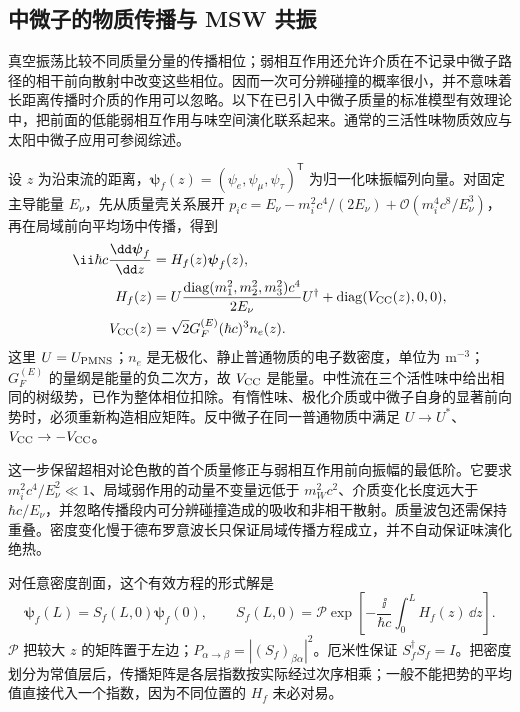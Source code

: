 \subsection{中微子的物质传播与 MSW 共振}
\label{sec:sm-neutrino-matter-applications}

真空振荡比较不同质量分量的传播相位；弱相互作用还允许介质在不记录中微子路径的相干前向散射中改变这些相位。因而一次可分辨碰撞的概率很小，并不意味着长距离传播时介质的作用可以忽略。以下在已引入中微子质量的标准模型有效理论中，把前面的低能弱相互作用与味空间演化联系起来。通常的三活性味物质效应与太阳中微子应用可参阅综述\cite{GonzalezGarciaYokoyama2024Neutrino}。

设 $z$ 为沿束流的距离，$\boldsymbol\psi_f(z)=(\psi_e,\psi_\mu,\psi_\tau)^{\mathsf T}$ 为归一化味振幅列向量。对固定主导能量 $E_\nu$，先从质量壳关系展开 $p_ic=E_\nu-m_i^2c^4/(2E_\nu)+\mathcal O(m_i^4c^8/E_\nu^3)$，再在局域前向平均场中传播，得到
\begin{equation}
 \begin{aligned}
 \ii\hbar c\frac{\dd\boldsymbol\psi_f}{\dd z}
 &=H_f(z)\boldsymbol\psi_f(z),\\
 H_f(z)&=U\frac{\operatorname{diag}(m_1^2,m_2^2,m_3^2)c^4}{2E_\nu}U^\dagger
       +\operatorname{diag}(V_{\rm CC}(z),0,0),\\
 V_{\rm CC}(z)&=\sqrt2G_F^{(E)}(\hbar c)^3 n_e(z).
 \end{aligned}
 \label{eq:sm-matter-flavor-hamiltonian}
\end{equation}
这里 $U=U_{\rm PMNS}$；$n_e$ 是无极化、静止普通物质的电子数密度，单位为 $\mathrm{m^{-3}}$；$G_F^{(E)}$ 的量纲是能量的负二次方，故 $V_{\rm CC}$ 是能量。中性流在三个活性味中给出相同的树级势，已作为整体相位扣除。有惰性味、极化介质或中微子自身的显著前向势时，必须重新构造相应矩阵。反中微子在同一普通物质中满足 $U\to U^*$、$V_{\rm CC}\to -V_{\rm CC}$。

这一步保留超相对论色散的首个质量修正与弱相互作用前向振幅的最低阶。它要求 $m_i^2c^4/E_\nu^2\ll1$、局域弱作用的动量不变量远低于 $m_W^2c^2$、介质变化长度远大于 $\hbar c/E_\nu$，并忽略传播段内可分辨碰撞造成的吸收和非相干散射。质量波包还需保持重叠。密度变化慢于德布罗意波长只保证局域传播方程成立，并不自动保证味演化绝热。

对任意密度剖面，这个有效方程的形式解是
\begin{equation}
 \boldsymbol\psi_f(L)=S_f(L,0)\boldsymbol\psi_f(0),\qquad
 S_f(L,0)=\mathcal P\exp\!\left[-\frac{\ii}{\hbar c}
 \int_0^L H_f(z)\,\dd z\right].
 \label{eq:sm-matter-path-ordered}
\end{equation}
$\mathcal P$ 把较大 $z$ 的矩阵置于左边；$P_{\alpha\to\beta}=|(S_f)_{\beta\alpha}|^2$。厄米性保证 $S_f^\dagger S_f=I$。把密度划分为常值层后，传播矩阵是各层指数按实际经过次序相乘；一般不能把势的平均值直接代入一个指数，因为不同位置的 $H_f$ 未必对易。

